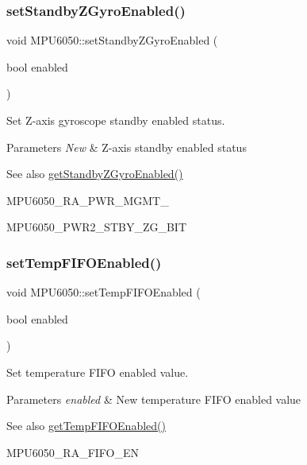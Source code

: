 \subsubsection{\texorpdfstring{setStandbyZGyroEnabled()}{setStandbyZGyroEnabled()}}
{\footnotesize\ttfamily void M\+P\+U6050\+::set\+Standby\+Z\+Gyro\+Enabled (\begin{DoxyParamCaption}\item[{bool}]{enabled }\end{DoxyParamCaption})}

Set Z-\/axis gyroscope standby enabled status. 
\begin{DoxyParams}{Parameters}
{\em New} & Z-\/axis standby enabled status \\
\hline
\end{DoxyParams}
\begin{DoxySeeAlso}{See also}
\mbox{\hyperlink{class_m_p_u6050_a20f7804db1a980a3c425ae44c33d420b}{get\+Standby\+Z\+Gyro\+Enabled()}} 

M\+P\+U6050\+\_\+\+R\+A\+\_\+\+P\+W\+R\+\_\+\+M\+G\+M\+T\+\_ 

M\+P\+U6050\+\_\+\+P\+W\+R2\+\_\+\+S\+T\+B\+Y\+\_\+\+Z\+G\+\_\+\+B\+IT 
\end{DoxySeeAlso}
\mbox{\label{class_m_p_u6050_ae528a25b4997ad0e3091a012e4e4419e}} 
\subsubsection{\texorpdfstring{setTempFIFOEnabled()}{setTempFIFOEnabled()}}
{\footnotesize\ttfamily void M\+P\+U6050\+::set\+Temp\+F\+I\+F\+O\+Enabled (\begin{DoxyParamCaption}\item[{bool}]{enabled }\end{DoxyParamCaption})}

Set temperature F\+I\+FO enabled value. 
\begin{DoxyParams}{Parameters}
{\em enabled} & New temperature F\+I\+FO enabled value \\
\hline
\end{DoxyParams}
\begin{DoxySeeAlso}{See also}
\mbox{\hyperlink{class_m_p_u6050_a913c2095001e204b5b09f8382a86d2ca}{get\+Temp\+F\+I\+F\+O\+Enabled()}} 

M\+P\+U6050\+\_\+\+R\+A\+\_\+\+F\+I\+F\+O\+\_\+\+EN 
\end{DoxySeeAlso}
\mbox{\label{class_m_p_u6050_a0113871802e88c80fe69ce1f607987ff}} 
